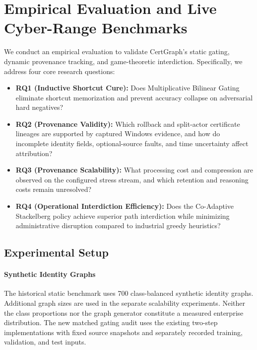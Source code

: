 \section{Empirical Evaluation and Live Cyber-Range Benchmarks}
\label{sec:evaluation}

We conduct an empirical evaluation to validate CertGraph's static gating, dynamic provenance tracking, and game-theoretic interdiction. Specifically, we address four core research questions:
\begin{itemize}
    \item \textbf{RQ1 (Inductive Shortcut Cure):} Does Multiplicative Bilinear Gating eliminate shortcut memorization and prevent accuracy collapse on adversarial hard negatives?
    \item \textbf{RQ2 (Provenance Validity):} Which rollback and split-actor certificate lineages are supported by captured Windows evidence, and how do incomplete identity fields, optional-source faults, and time uncertainty affect attribution?
    \item \textbf{RQ3 (Provenance Scalability):} What processing cost and compression are observed on the configured stress stream, and which retention and reasoning costs remain unresolved?
    \item \textbf{RQ4 (Operational Interdiction Efficiency):} Does the Co-Adaptive Stackelberg policy achieve superior path interdiction while minimizing administrative disruption compared to industrial greedy heuristics?
\end{itemize}

\subsection{Experimental Setup}
\paragraph{Synthetic Identity Graphs} The historical static benchmark uses 700 class-balanced synthetic identity graphs. Additional graph sizes are used in the separate scalability experiments. Neither the class proportions nor the graph generator constitute a measured enterprise distribution. The new matched gating audit uses the existing two-step implementations with fixed source snapshots and separately recorded training, validation, and test inputs.

